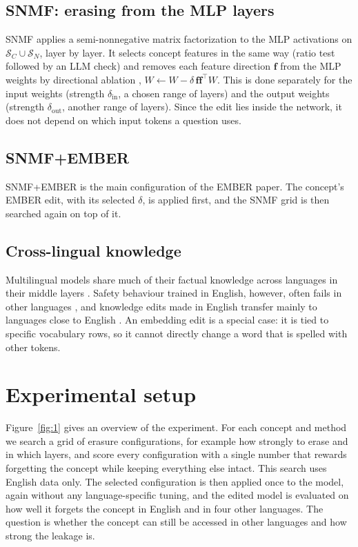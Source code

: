 \documentclass[11pt]{article}
\begin{document}
\subsection{SNMF: erasing from the MLP layers}\label{sec:2.3}

SNMF applies a semi-nonnegative matrix factorization to the MLP activations on $\mathcal{S}_C\cup\mathcal{S}_N$, layer by layer. It selects concept features in the same way (ratio test followed by an LLM check) and removes each feature direction $\mathbf{f}$ from the MLP weights by directional ablation \citep{arditi2024refusal}, $W\leftarrow W-\delta\,\mathbf{f}\mathbf{f}^{\top}W$. This is done separately for the input weights (strength $\delta_{\mathrm{in}}$, a chosen range of layers) and the output weights (strength $\delta_{\mathrm{out}}$, another range of layers). Since the edit lies inside the network, it does not depend on which input tokens a question uses.

\subsection{SNMF+EMBER}\label{sec:2.4}

SNMF+EMBER is the main configuration of the EMBER paper. The concept's EMBER edit, with its selected $\delta$, is applied first, and the SNMF grid is then searched again on top of it.

\subsection{Cross-lingual knowledge}\label{sec:2.5}

Multilingual models share much of their factual knowledge across languages in their middle layers \citep{wendler2024llamas}. Safety behaviour trained in English, however, often fails in other languages \citep{deng2024multilingual,yong2023lowresource}, and knowledge edits made in English transfer mainly to languages close to English \citep{qi2023crosslingual,wang2024crosslingualediting}. An embedding edit is a special case: it is tied to specific vocabulary rows, so it cannot directly change a word that is spelled with other tokens.

\section{Experimental setup}\label{sec:3}

Figure~\ref{fig:1} gives an overview of the experiment. For each concept and method we search a grid of erasure configurations, for example how strongly to erase and in which layers, and score every configuration with a single number that rewards forgetting the concept while keeping everything else intact. This search uses English data only. The selected configuration is then applied once to the model, again without any language-specific tuning, and the edited model is evaluated on how well it forgets the concept in English and in four other languages. The question is whether the concept can still be accessed in other languages and how strong the leakage is.
\end{document}
